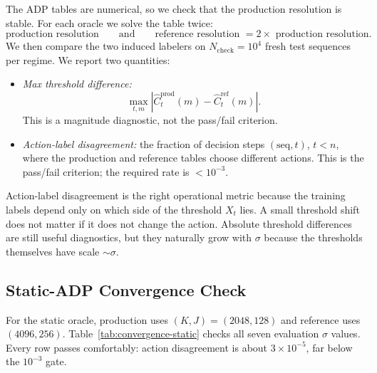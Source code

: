 \documentclass[11pt]{article}
\begin{document}
The ADP tables are numerical, so we check that the production resolution is stable. For each oracle we solve the table twice:
\[
\text{production resolution}
\qquad\text{and}\qquad
\text{reference resolution } = 2\times\text{ production resolution}.
\]
We then compare the two induced labelers on \(N_{\mathrm{check}}=10^4\) fresh test sequences per regime. We report two quantities:
\begin{itemize}
\item \emph{Max threshold difference:}
\[
\max_{t,m}\left|\widehat C_t^{\mathrm{prod}}(m)-\widehat C_t^{\mathrm{ref}}(m)\right|.
\]
This is a magnitude diagnostic, not the pass/fail criterion.
\item \emph{Action-label disagreement:} the fraction of decision steps \((\mathrm{seq},t)\), \(t<n\), where the production and reference tables choose different actions. This is the pass/fail criterion; the required rate is \(<10^{-3}\).
\end{itemize}
Action-label disagreement is the right operational metric because the training labels depend only on which side of the threshold \(X_t\) lies. A small threshold shift does not matter if it does not change the action. Absolute threshold differences are still useful diagnostics, but they naturally grow with \(\sigma\) because the thresholds themselves have scale \(\sim\sigma\).

\subsection{Static-ADP Convergence Check}
\label{app:convergence-static}

For the static oracle, production uses \((K,J)=(2048,128)\) and reference uses \((4096,256)\). Table~\ref{tab:convergence-static} checks all seven evaluation \(\sigma\) values. Every row passes comfortably: action disagreement is about \(3\times10^{-5}\), far below the \(10^{-3}\) gate.
\end{document}
